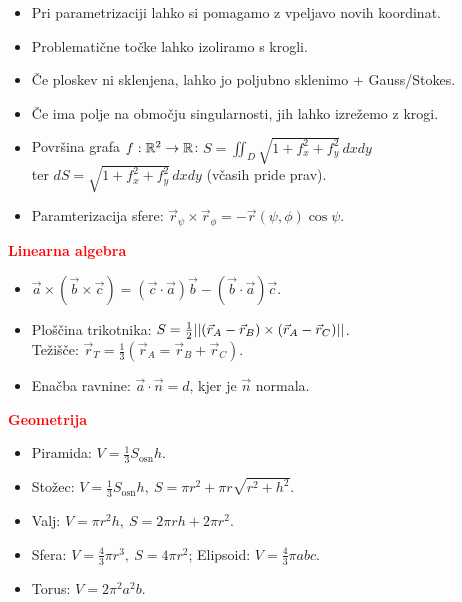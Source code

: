\documentclass[a4paper,oneside,8pt,landscape]{extarticle}
\begin{document}
\begin{multicols*}{3}
\begin{itemize}
    \item Pri parametrizaciji lahko si pomagamo z vpeljavo novih koordinat.
    \item Problematične točke lahko izoliramo s krogli.
    \item Če ploskev ni sklenjena, lahko jo poljubno sklenimo + Gauss/Stokes.
    \item Če ima polje na območju singularnosti, jih lahko izrežemo z krogi.
    \item Površina grafa \(f: \mathbb{R}^2 \to \mathbb{R}\): \(S = \iint_D \sqrt{1 + f_x^2+f_y^2}\, dxdy\)\\ ter \(dS = \sqrt{1 + f_x^2+f_y^2}\, dxdy\) (včasih pride prav).
    \item Paramterizacija sfere: \(\vec{r}_\psi \times \vec{r}_\phi = - \vec{r}(\psi, \phi) \cos\psi.\)
\end{itemize}
%
%
\textbf{\textcolor{red}{Linearna algebra}}
\begin{itemize}
    \item \(\vec{a} \times (\vec{b} \times \vec{c}) = (\vec{c} \cdot \vec{a}) \vec{b} - (\vec{b} \cdot \vec{a}) \vec{c}\).
    \item Ploščina trikotnika: \(S = \frac{1}{2} ||(\vec{r}_A - \vec{r}_B) \times (\vec{r}_A - \vec{r}_C)||\).\\ Težišče: \(\vec{r}_T = \frac{1}{3}(\vec{r}_A = \vec{r}_B + \vec{r}_C)\).
    \item Enačba ravnine: \(\vec{a} \cdot \vec{n} = d\), kjer je \(\vec{n}\) normala.
\end{itemize}
%
%
\textbf{\textcolor{red}{Geometrija}}
\begin{itemize}
    \item Piramida: \(V = \frac{1}{3}S_\text{osn} h\).
    \item Stožec: \(V = \frac{1}{3}S_\text{osn} h, \ S = \pi r^2 + \pi r \sqrt{r^2+h^2}\).
    \item Valj: \(V = \pi r^2 h, \ S = 2\pi rh+2\pi r^2\).
    \item Sfera: \(V = \frac{4}{3} \pi r^3, \ S = 4 \pi r^2\); Elipsoid: \(V = \frac{4}{3} \pi abc\).
    \item Torus: \(V = 2\pi^2 a^2 b\).
\end{itemize}

\end{multicols*}
\end{document}
